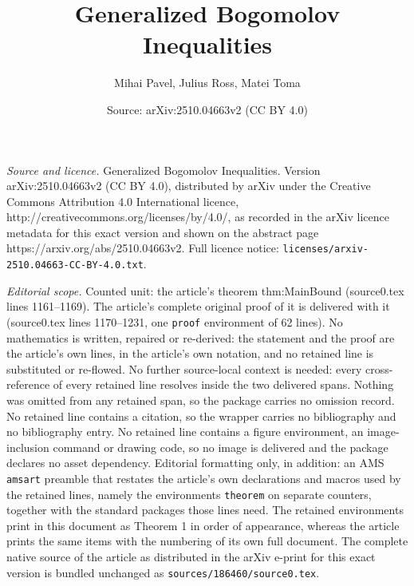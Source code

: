 \documentclass[10pt,a4paper]{amsart}
\title{Generalized Bogomolov Inequalities}
\author{Mihai Pavel, Julius Ross, Matei Toma}
\date{Source: arXiv:2510.04663v2 (CC BY 4.0)}
\begin{document}
\maketitle

\noindent\emph{Source and licence.} Generalized Bogomolov Inequalities. Version arXiv:2510.04663v2 (CC BY 4.0), distributed by arXiv under the Creative Commons Attribution 4.0 International licence, http://creativecommons.org/licenses/by/4.0/, as recorded in the arXiv licence metadata for this exact version and shown on the abstract page https://arxiv.org/abs/2510.04663v2. Full licence notice: \texttt{licenses/arxiv-2510.04663-CC-BY-4.0.txt}.\par\smallskip

\noindent\textit{Editorial scope.} Counted unit: the article's theorem thm:MainBound (source0.tex lines 1161--1169). The article's complete original proof of it is delivered with it (source0.tex lines 1170--1231, one \texttt{proof} environment of 62 lines). No mathematics is written, repaired or re-derived: the statement and the proof are the article's own lines, in the article's own notation, and no retained line is substituted or re-flowed.  No further source-local context is needed: every cross-reference of every retained line resolves inside the two delivered spans.  Nothing was omitted from any retained span, so the package carries no omission record.  No retained line contains a citation, so the wrapper carries no bibliography and no bibliography entry.  No retained line contains a figure environment, an image-inclusion command or drawing code, so no image is delivered and the package declares no asset dependency.  Editorial formatting only, in addition: an AMS \texttt{amsart} preamble that restates the article's own declarations and macros used by the retained lines, namely the environments \texttt{theorem} on separate counters, together with the standard packages those lines need.  The retained environments print in this document as Theorem 1 in order of appearance, whereas the article prints the same items with the numbering of its own full document.  The complete native source of the article as distributed in the arXiv e-print for this exact version is bundled unchanged as \texttt{sources/186460/source0.tex}.
\end{document}
